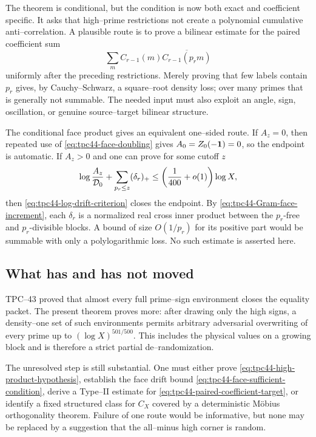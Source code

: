 The theorem is conditional, but the condition is now both exact and
coefficient specific.  It asks that high--prime restrictions not create
a polynomial cumulative anti--correlation.  A plausible route is to
prove a bilinear estimate for the paired coefficient sum
\begin{equation}
 \sum_m C_{r-1}(m)\overline{C_{r-1}(p_rm)}
 \label{eq:tpc44-paired-coefficient-target}
\end{equation}
uniformly after the preceding restrictions.  Merely proving that few
labels contain \(p_r\) gives, by Cauchy--Schwarz, a square--root density
loss; over many primes that is generally not summable.  The needed
input must also exploit an angle, sign, oscillation, or genuine
source--target bilinear structure.

The conditional face product gives an equivalent one--sided route.  If
\(A_z=0\), then repeated use of \eqref{eq:tpc44-face-doubling} gives
\(A_0=Z_0(-\mathbf 1)=0\), so the endpoint is automatic.  If \(A_z>0\) and one
can prove for some cutoff \(z\)
\begin{equation}
 \log\frac{A_z}{\mathcal D_0}
 +\sum_{p_r\le z}(\delta_r)_+
 \le\left(\frac1{400}+o(1)\right)\log X,
 \label{eq:tpc44-face-sufficient-condition}
\end{equation}
then \eqref{eq:tpc44-log-drift-criterion} closes the endpoint.  By
\eqref{eq:tpc44-Gram-face-increment}, each \(\delta_r\) is a normalized
real cross inner product between the \(p_r\)-free and
\(p_r\)-divisible blocks.  A bound of size
\(O(1/p_r)\) for its positive part would be summable with only a
polylogarithmic loss.  No such estimate is asserted here.

\subsection{What has and has not moved}

TPC--43 proved that almost every full prime--sign environment closes the
equality packet.  The present theorem proves more: after drawing only
the high signs, a density--one set of such environments permits arbitrary
adversarial overwriting of every prime up to
\((\log X)^{501/500}\).  This includes the physical values on a growing
block and is therefore a strict partial de--randomization.

The unresolved step is still substantial.  One must either prove
\eqref{eq:tpc44-high-product-hypothesis}, establish the face drift bound
\eqref{eq:tpc44-face-sufficient-condition}, derive a Type--II estimate
for \eqref{eq:tpc44-paired-coefficient-target}, or identify a fixed
structured class for \(C_X\) covered by a deterministic M\"obius
orthogonality theorem.  Failure of one route would be informative, but
none may be replaced by a suggestion that the all--minus high corner is
random.

